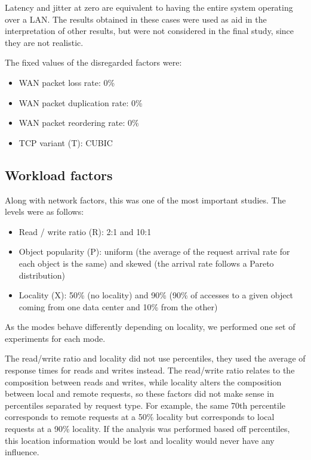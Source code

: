 \documentclass[doublespacing]{bmcart}
\begin{document}
Latency and jitter at zero are equivalent to having the entire system operating
over a LAN. The results obtained in these cases were used as aid in the
interpretation of other results, but were not considered in the final study,
since they are not realistic.

The fixed values of the disregarded factors were:

\begin{itemize}

\item WAN packet loss rate: 0\%

\item WAN packet duplication rate: 0\%

\item WAN packet reordering rate: 0\%

\item TCP variant (T): CUBIC

\end{itemize}

\subsection{Workload factors}

Along with network factors, this was one of the most important studies. The
levels were as follows:

\begin{itemize}

\item Read / write ratio (R): 2:1 and 10:1

\item Object popularity (P): uniform (the average of the request arrival rate
for each object is the same) and skewed (the arrival rate follows a Pareto
distribution)

\item Locality (X): 50\% (no locality) and 90\% (90\% of accesses to a given
object coming from one data center and 10\% from the other)

\end{itemize}

As the modes behave differently depending on locality, we performed one set of
experiments for each mode.

The read/write ratio and locality did not use percentiles, they used the
average of response times for reads and writes instead. The read/write ratio
relates to the composition between reads and writes, while locality alters the
composition between local and remote requests, so these factors did not make
sense in percentiles separated by request type. For example, the same 70th
percentile corresponds to remote requests at a 50\% locality but corresponds to
local requests at a 90\% locality. If the analysis was performed based off
percentiles, this location information would be lost and locality would never
have any influence.
\end{document}
